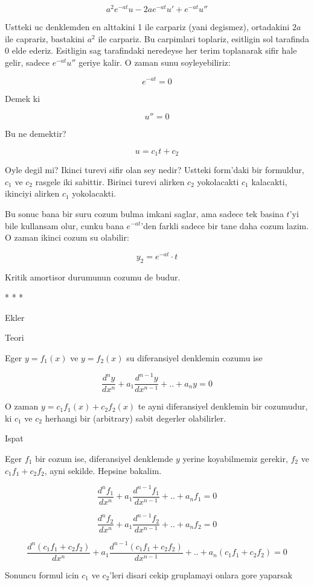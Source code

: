 \documentclass[12pt,fleqn]{article}
\begin{document}
\[ a^2e^{-at}u - 2ae^{-at}u' + e^{-at}u'' \]

Ustteki uc denklemden en alttakini 1 ile carpariz (yani degismez),
ortadakini $2a$ ile caprariz, bastakini $a^2$ ile carpariz. Bu carpimlari
toplariz, esitligin sol tarafinda 0 elde ederiz. Esitligin sag tarafindaki
neredeyse her terim toplanarak sifir hale gelir, sadece $e^{-at}u''$ geriye
kalir. O zaman sunu soyleyebiliriz:

\[ e^{-at} = 0 \]

Demek ki 

\[ u'' = 0 \]

Bu ne demektir?

\[ u = c_1t + c_2 \]

Oyle degil mi? Ikinci turevi sifir olan sey nedir? Ustteki form'daki bir
formuldur, $c_1$ ve $c_2$ rasgele iki sabittir. Birinci turevi alirken $c_2$
yokolacakti $c_1$ kalacakti, ikinciyi alirken $c_1$ yokolacakti. 

Bu sonuc bana bir suru cozum bulma imkani saglar, ama sadece tek basina
$t$'yi bile kullansam olur, cunku bana $e^{-at}$'den farkli sadece bir tane
daha cozum lazim. O zaman ikinci cozum su olabilir:

\[ y_2 = e^{-at} \cdot t \]

Kritik amortisor durumunun cozumu de budur. 

* * * 

Ekler

Teori

Eger $y=f_1(x)$ ve $y=f_2(x)$ su diferansiyel denklemin cozumu ise

\[ \frac{d^ny}{dx^n} + a_1 \frac{d^{n-1}y}{dx^{n-1}} + .. + a_n y = 0\]


O zaman $y=c_1f_1(x) + c_2f_2(x)$ te ayni diferansiyel denklemin bir
cozumudur, ki $c_1$ ve $c_2$ herhangi bir (arbitrary) sabit degerler olabilirler.

Ispat

Eger $f_1$ bir cozum ise, diferansiyel denklemde $y$ yerine koyabilmemiz
gerekir, $f_2$ ve $c_1f_1 + c_2f_2$, ayni sekilde. Hepsine bakalim.

\[ \frac{d^nf_1}{dx^n} + a_1 \frac{d^{n-1}f_1}{dx^{n-1}} + .. + a_n f_1 = 0\]

\[ \frac{d^nf_2}{dx^n} + a_1 \frac{d^{n-1}f_2}{dx^{n-1}} + .. + a_n f_2 = 0\]

\[ \frac{d^n(c_1f_1 + c_2f_2)}{dx^n} + 
a_1 \frac{d^{n-1}(c_1f_1 + c_2f_2)}{dx^{n-1}} + .. + 
a_n (c_1f_1 + c_2f_2) = 0
\]

Sonuncu formul icin $c_1$ ve $c_2$'leri disari cekip gruplamayi onlara gore
yaparsak
\end{document}
